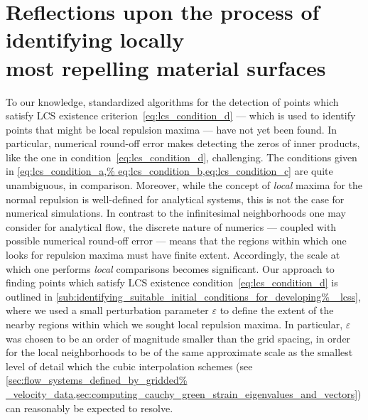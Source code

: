 \section[Reflections upon the process of identifying locally most
repelling material surfaces]
{Reflections upon the process of identifying locally \\\phantom{5.3} most
repelling material surfaces}
\label{sec:reflections_on_the_process_of_identifying_locally_most_normally%
_repelling_material_surfaces}

To our knowledge, standardized algorithms for the detection of points which
satisfy LCS existence criterion~\eqref{eq:lcs_condition_d} --- which is used to
identify points that might be local repulsion maxima --- have not yet been
found. In particular, numerical round-off error makes detecting the zeros of
inner products, like the one in condition~\eqref{eq:lcs_condition_d},
challenging. The conditions given in \cref{eq:lcs_condition_a,%
eq:lcs_condition_b,eq:lcs_condition_c} are quite unambiguous, in comparison.
Moreover, while the concept of \emph{local} maxima for the normal repulsion is
well-defined for analytical systems, this is not the case for numerical
simulations. In contrast to the infinitesimal neighborhoods one may consider
for analytical flow, the discrete nature of numerics --- coupled with possible
numerical round-off error --- means that the regions within which one looks for
repulsion maxima must have finite extent. Accordingly, the scale at which one
performs \emph{local} comparisons becomes significant. Our approach to finding
points which satisfy LCS existence condition~\eqref{eq:lcs_condition_d} is
outlined in \cref{sub:identifying_suitable_initial_conditions_for_developing%
_lcss}, where we used a small perturbation parameter $\varepsilon$ to define
the extent of  the nearby regions within which we sought local repulsion
maxima. In particular, $\varepsilon$ was chosen to be an order of magnitude
smaller than the grid spacing, in order for the local neighborhoods to be of
the same approximate scale as the smallest level of detail which the cubic
interpolation schemes (see \cref{sec:flow_systems_defined_by_gridded%
_velocity_data,sec:computing_cauchy_green_strain_eigenvalues_and_vectors}) can
reasonably be expected to resolve.

